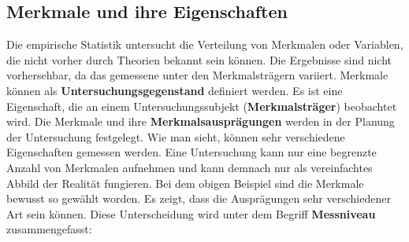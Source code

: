 \subsection{Merkmale und ihre Eigenschaften}
Die empirische Statistik untersucht die Verteilung von Merkmalen oder Variablen, die nicht vorher durch Theorien bekannt sein können.
Die Ergebnisse sind nicht vorhersehbar, da das gemessene unter den Merkmalsträgern variiert.
\newline
Merkmale können als \textbf{Untersuchungsgegenstand} definiert werden. Es ist eine Eigenschaft, die an einem Untersuchungssubjekt (\textbf{Merkmalsträger}) beobachtet wird.
Die Merkmale und ihre \textbf{Merkmalsausprägungen} werden in der Planung der Untersuchung festgelegt.
Wie man sieht, können sehr verschiedene Eigenschaften gemessen werden. Eine Untersuchung kann nur eine begrenzte Anzahl von Merkmalen aufnehmen und kann demnach nur als vereinfachtes Abbild der Realität fungieren.
\newline
Bei dem obigen Beispiel sind die Merkmale bewusst so gewählt worden. Es zeigt, dass die Ausprägungen sehr verschiedener Art sein können.
Diese Unterscheidung wird unter dem Begriff \textbf{Messniveau} zusammengefasst:
